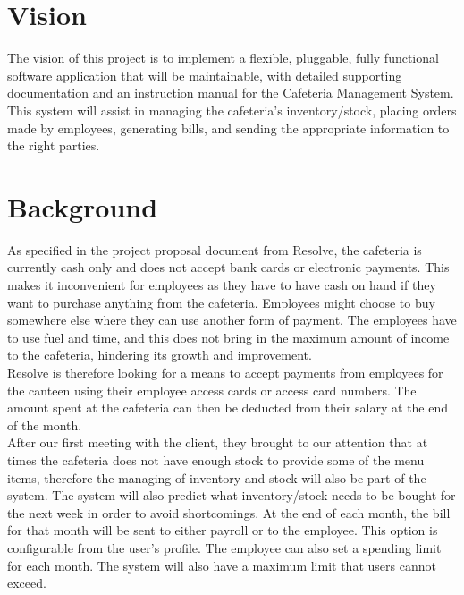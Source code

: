 \documentclass[a4paper,12pt]{article}
\begin{document}
\section{Vision}
The vision of this project is to implement a flexible, pluggable, fully functional software application that will be maintainable, with detailed supporting documentation and an instruction manual for the Cafeteria Management System. This system will assist in managing the cafeteria's inventory/stock, placing orders made by employees, generating bills, and sending the appropriate information to the right parties.  

\section{Background}
As specified in the project proposal document from Resolve, the cafeteria is currently cash only and does not accept bank cards or electronic payments. This makes it inconvenient for employees as they have to have cash on hand if they want to purchase anything from the cafeteria. Employees might choose to buy somewhere else where they can use another form of payment. The employees have to use fuel and time, and this does not bring in the maximum amount of income to the cafeteria, hindering its growth and improvement.\\

Resolve is therefore looking for a means to accept payments from employees for the canteen using their employee access cards or access card numbers. The amount spent at the cafeteria can then be deducted from their salary at the end of the month.\\

After our first meeting with the client, they brought to our attention that at times the cafeteria does not have enough stock to provide some of the menu items, therefore the managing of inventory and stock will also be part of the system. The system will also predict what inventory/stock needs to be bought for the next week in order to avoid shortcomings. At the end of each month, the bill for that month will be sent to either payroll or to the employee. This option is configurable from the user's profile. The employee can also set a spending limit for each month. The system will also have a maximum limit that users cannot exceed.
 
\end{document}
